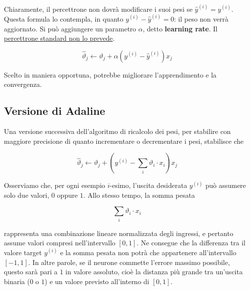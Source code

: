 Chiaramente, il percettrone non dovrà modificare i suoi pesi se $\hat{y}^{(i)} = y^{(i)}$. Questa formula lo contempla, in quanto $y^{(i)} - \hat{y}^{(i)} = 0$: il peso non verrà aggiornato. 
Si può aggiungere un parametro $\alpha$, detto \textbf{learning rate}. Il \underline{percettrone standard non lo prevede}.

$$
\hat{\vartheta}_j \leftarrow \vartheta_j + \alpha( y^{(i)} -\hat{y}^{(i)})x_j
$$

\noindent
Scelto in maniera opportuna, potrebbe migliorare l'apprendimento e la convergenza.

\subsection{Versione di Adaline}

Una versione successiva dell'algoritmo di ricalcolo dei pesi, per stabilire con maggiore precisione di quanto incrementare o decrementare i pesi, stabilisce che

$$
\hat{\vartheta}_j \leftarrow \vartheta_j + \left( y^{(i)} - \sum_{i}\vartheta_i \cdot x_i\right)x_j
$$

\noindent
Osserviamo che, per ogni esempio $i$-esimo, l'uscita desiderata $y^{(i)}$ può assumere solo due valori, $0$ oppure $1$. Allo stesso tempo, la somma pesata 

\[
\sum_i \vartheta_i \cdot x_i
\]

\noindent
rappresenta una combinazione lineare normalizzata degli ingressi, e pertanto assume valori compresi nell'intervallo $[0,1]$.  Ne consegue che la differenza tra il valore target $y^{(i)}$ e la somma pesata non potrà che appartenere all’intervallo $[-1,1]$. In altre parole, se il neurone commette l’errore massimo possibile, questo sarà pari a $1$ in valore assoluto, cioè la distanza più grande tra un’uscita binaria ($0$ o $1$) e un valore previsto all’interno di $[0,1]$.
